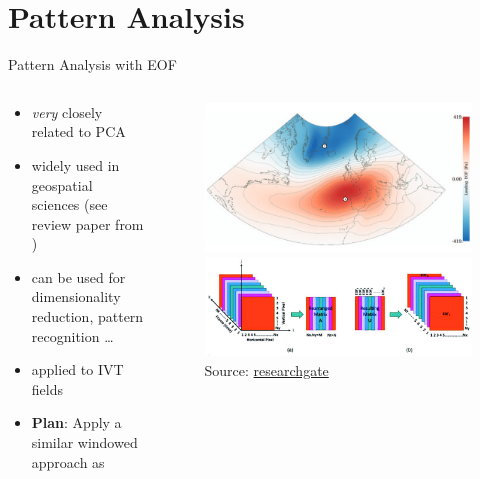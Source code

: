 \section{Pattern Analysis}

\begin{frame}{Pattern Analysis with EOF}
  \begin{columns}
    \begin{column}{.5\textwidth}
      \begin{itemize}
        \item \textit{very} closely related to PCA 
        \item widely used in geospatial sciences (see review paper from \citeauthor{hannachi_empirical_2007} \cite{hannachi_empirical_2007})
        \item can be used for dimensionality reduction, pattern recognition \dots
        \item applied to IVT fields \cite{ayantobo_integrated_2022, salstein_modes_1983, jiang_water_2009}
        \item \textbf{Plan}: Apply a similar windowed approach as \citeauthor{vietinghoff_visual_2021}
      \end{itemize} 
      
    \end{column}
    \begin{column}{.5\textwidth}
    \begin{figure}[t]
      \centering
      \includegraphics[width=.7\columnwidth]{imglib/nao_eof_index.png}\\
      \includegraphics[width=.9 \columnwidth]{imglib/eof_matrix_decomp.png}
      {\tiny Source: \href{https://www.researchgate.net/publication/357212141_Latest_Advances_in_Common_Signal_Processing_of_Pulsed_Thermography_for_Enhanced_Detectability_A_Review/figures?lo=1}{researchgate}}
    \end{figure}

    \end{column}
    
  \end{columns}
\end{frame}


